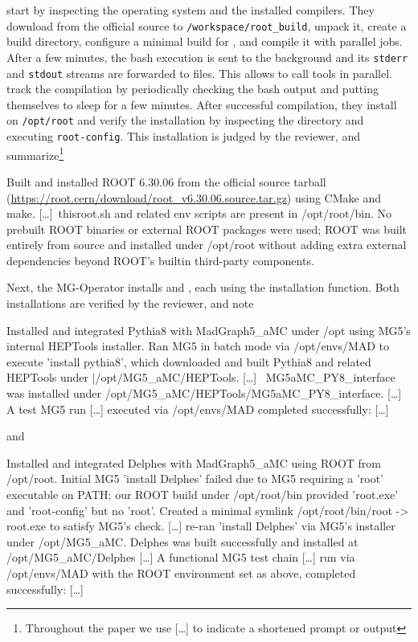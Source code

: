 \documentclass[submission, Phys]{SciPost}
\begin{document}
\ma start by inspecting the operating system and the installed compilers. They download  \root from the official source to \lstinline|/workspace/root_build|, unpack it, create a build directory, configure a minimal \root build for \delphes, and compile it with parallel jobs. After a few minutes, the bash execution is sent to the background and its \lstinline|stderr| and \lstinline|stdout| streams are forwarded to files. This allows \ma to call tools in parallel. \ma track the compilation by periodically checking the bash output and putting themselves to sleep for a few minutes. After successful compilation, they install \root on \lstinline|/opt/root| and verify the installation by inspecting the \root directory and executing \lstinline|root-config|. This installation is judged by the reviewer, and \ma summarize\footnote{Throughout the paper we use [\dots] to indicate a shortened \ma prompt or output} 
%
\begin{planblock}
Built and installed ROOT 6.30.06 from the official source tarball (\url{https://root.cern/download/root_v6.30.06.source.tar.gz}) using CMake and make. [\ldots]\ thisroot.sh and related env scripts are present in /opt/root/bin. No prebuilt ROOT binaries or external ROOT packages were used; ROOT was built entirely from source and installed under /opt/root without adding extra external dependencies beyond ROOT’s builtin third-party components.
\end{planblock}
%
Next, the MG-Operator installs \pythia and \delphes, each using the \mg installation function. Both installations are verified by the reviewer, and \ma note
%
\begin{planblock}
Installed and integrated Pythia8 with MadGraph5\_aMC under /opt using MG5’s internal HEPTools installer. Ran MG5 in batch mode via /opt/envs/MAD to execute 'install pythia8', which downloaded and built Pythia8 and related HEPTools under |/opt/MG5\_aMC/HEPTools. [\ldots] \ 
MG5aMC\_PY8\_interface was installed under /opt/MG5\_aMC/HEPTools/MG5aMC\_PY8\_interface. [\ldots] A test MG5 run [\ldots] executed via /opt/envs/MAD completed successfully: [\ldots]
\end{planblock}
%
and
%
\begin{planblock} 
Installed and integrated Delphes with MadGraph5\_aMC using ROOT from /opt/root. Initial MG5 'install Delphes' failed due to MG5 requiring a 'root' executable on PATH; our ROOT build under /opt/root/bin provided 'root.exe' and 'root-config' but no 'root'. Created a minimal symlink /opt/root/bin/root -> root.exe to satisfy MG5's check. [\ldots] re-ran 'install Delphes' via MG5's installer under /opt/MG5\_aMC. Delphes was built successfully and installed at /opt/MG5\_aMC/Delphes [\ldots]  A functional MG5 test chain [\ldots] run via /opt/envs/MAD with the ROOT environment set as above, completed successfully: [\ldots]
\end{planblock}
\end{document}
